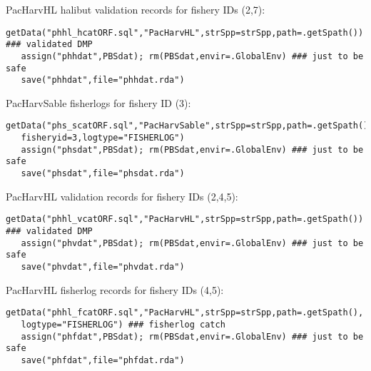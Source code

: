 \documentclass[letterpaper,12pt,fleqn]{article}
\newcommand{\db}[1]{\small\textmd{\textsf{#1}}\normalsize}
\begin{document}
\vspace*{2ex} 
\begin{dfobox} %
\color{blue}
\db{PacHarvHL} halibut validation records for fishery IDs (2,7):\vspace*{0.5ex}
\begin{Verbatim}[formatcom=\color{dodgerblue},fontsize=\footnotesize]
getData("phhl_hcatORF.sql","PacHarvHL",strSpp=strSpp,path=.getSpath()) ### validated DMP
   assign("phhdat",PBSdat); rm(PBSdat,envir=.GlobalEnv) ### just to be safe
   save("phhdat",file="phhdat.rda")
\end{Verbatim}
\end{dfobox}

\vspace*{2ex} 
\begin{dfobox} %
\color{blue}
\db{PacHarvSable} fisherlogs for fishery ID (3):\vspace*{0.5ex}
\begin{Verbatim}[formatcom=\color{dodgerblue},fontsize=\footnotesize]
getData("phs_scatORF.sql","PacHarvSable",strSpp=strSpp,path=.getSpath(),
   fisheryid=3,logtype="FISHERLOG")
   assign("phsdat",PBSdat); rm(PBSdat,envir=.GlobalEnv) ### just to be safe
   save("phsdat",file="phsdat.rda")
\end{Verbatim}
\end{dfobox}

\vspace*{2ex} 
\begin{dfobox} %
\color{blue}
\db{PacHarvHL} validation records for fishery IDs (2,4,5):\vspace*{0.5ex}
\begin{Verbatim}[formatcom=\color{dodgerblue},fontsize=\footnotesize]
getData("phhl_vcatORF.sql","PacHarvHL",strSpp=strSpp,path=.getSpath()) ### validated DMP
   assign("phvdat",PBSdat); rm(PBSdat,envir=.GlobalEnv) ### just to be safe
   save("phvdat",file="phvdat.rda")
\end{Verbatim}
\end{dfobox}

\vspace*{2ex} 
\begin{dfobox} %
\color{blue}
\db{PacHarvHL} fisherlog records for fishery IDs (4,5):\vspace*{0.5ex}
\begin{Verbatim}[formatcom=\color{dodgerblue},fontsize=\footnotesize]
getData("phhl_fcatORF.sql","PacHarvHL",strSpp=strSpp,path=.getSpath(),
   logtype="FISHERLOG") ### fisherlog catch
   assign("phfdat",PBSdat); rm(PBSdat,envir=.GlobalEnv) ### just to be safe
   save("phfdat",file="phfdat.rda")
\end{Verbatim}
\end{dfobox}
\end{document}
